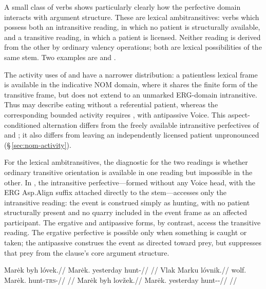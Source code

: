 \label{sec:ambitransitive}A small class of verbs shows particularly clearly how the perfective domain
interacts with argument structure. These are lexical ambitransitives: verbs
which possess both an intransitive reading, in which no patient is structurally
available, and a transitive reading, in which a patient is licensed. Neither
reading is derived from the other by ordinary valency operations; both are
lexical possibilities of the same stem. Two examples are   and  .

The activity uses of   and 
 have a narrower distribution: a patientless lexical frame is
available in the indicative NOM domain, where it shares the finite form of
the transitive frame, but does not extend to an unmarked ERG-domain
intransitive. Thus  may describe eating without a
referential patient, whereas the corresponding bounded activity requires
, with antipassive Voice. This aspect-conditioned
alternation differs from the freely available intransitive perfectives of
 and ; it also differs from leaving an independently
licensed patient unpronounced (§\,\ref{sec:nom-activity}).

For the lexical ambitransitives, the diagnostic for the two readings is
whether ordinary transitive orientation  is available in one reading
but impossible in the other. In , the
intransitive perfective---formed without any Voice head, with the ERG Asp.Align
suffix attached directly to the stem---accesses only the intransitive reading:
the event is construed simply as hunting, with no patient structurally present
and no quarry included in the event frame as an affected participant. The
ergative and antipassive forms, by contrast, access the transitive reading. The
ergative perfective  is possible only when something is caught or
taken; the antipassive construes the event as directed toward prey, but
suppresses that prey from the clause's core argument structure.

\pex
\a
\begingl
\gla Marėk byh lóvek.//
\glb Marėk.\Dir{} yesterday hunt-\Pf{}//
\glft {} //
\endgl
\a
\begingl
\gla Vlak Marku lóvnik.//
\glb wolf.\Dir{} Marėk.\Trs{} hunt-\textsc{trs}-\Pf{}//
\glft {} //
\endgl
\a
\begingl
\gla Marėk byh lovžek.//
\glb Marėk.\Dir{} yesterday hunt-\Antip{}-\Pf{}//
\glft {} //
\endgl
\xe


